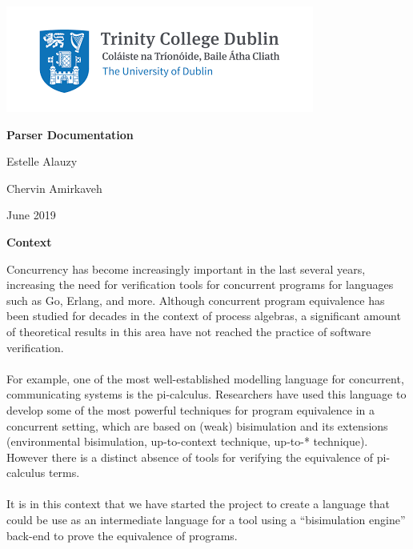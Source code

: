 \documentclass[11pt]{report}
\begin{document}
\begin{center}
\includegraphics[scale = 1]{index.png}
\end{center}

\pagestyle{empty}


\centerline{\textbf{\Huge Parser Documentation}}
\bigbreak\bigbreak
\bigbreak\bigbreak

\centerline{ {\Large Estelle Alauzy}}
\centerline{ {\Large  Chervin Amirkaveh}}


 \vfill
\centerline{\large June 2019}







\newpage
\centerline{\textbf{\Huge Context}}
\vspace*{3pt}
\vspace*{20pt}

\tabto{1cm}Concurrency has become increasingly important in the last several years, increasing the need for verification tools for concurrent programs for languages such as Go, Erlang, and more. Although concurrent program equivalence has been studied for decades in the context of process algebras, a significant amount of theoretical results in this area have not reached the practice of software verification. 
\\ \\
\tabto{1cm}For example, one of the most well-established modelling language for concurrent, communicating systems is the pi-calculus. Researchers have used this language to develop some of the
most powerful techniques for program equivalence in a concurrent setting, which are based on (weak) bisimulation and its extensions (environmental bisimulation, up-to-context technique, up-to-* technique). However there is a distinct absence of tools for verifying the equivalence of pi-calculus terms.
\\ \\
\tabto{1cm}It is in this context that we have started the project to create a language that could be use as an intermediate language for a tool using a “bisimulation engine” back-end to prove the equivalence of programs.
\end{document}
